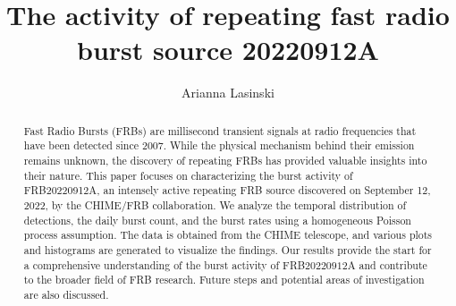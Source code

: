 \documentclass[twocolumn]{aastex631}
\begin{document}
\title{The activity of repeating fast radio burst source 20220912A}

\author{Arianna Lasinski}



\begin{abstract}
Fast Radio Bursts (FRBs) are millisecond transient signals at radio frequencies that have been detected since 2007. While the physical mechanism behind their emission remains unknown, the discovery of repeating FRBs has provided valuable insights into their nature. This paper focuses on characterizing the burst activity of FRB20220912A, an intensely active repeating FRB source discovered on September 12, 2022, by the CHIME/FRB collaboration. We analyze the temporal distribution of detections, the daily burst count, and the burst rates using a homogeneous Poisson process assumption. The data is obtained from the CHIME telescope, and various plots and histograms are generated to visualize the findings. Our results provide the start for a comprehensive understanding of the burst activity of FRB$20220912$A and contribute to the broader field of FRB research. Future steps and potential areas of investigation are also discussed.  

\end{abstract}


\end{document}
